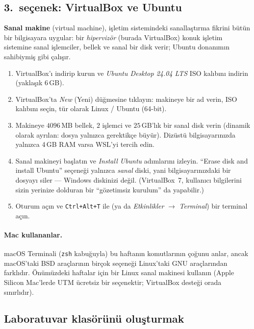 \documentclass[11pt,a4paper]{article}
\newcommand{\term}[1]{\textbf{\color{mintdeep}#1}}
\newcommand{\cmd}[1]{\texttt{#1}}
\begin{document}
\subsection{3.\ seçenek: VirtualBox ve Ubuntu}
\term{Sanal makine} (virtual machine), işletim sistemindeki sanallaştırma fikrini bütün bir bilgisayara uygular: bir \emph{hipervizör} (burada VirtualBox) konuk işletim sistemine sanal işlemciler, bellek ve sanal bir disk verir; Ubuntu donanımın sahibiymiş gibi çalışır.

\begin{enumerate}[leftmargin=1.4em]
  \item VirtualBox'ı indirip kurun ve \emph{Ubuntu Desktop 24.04 LTS} ISO kalıbını indirin (yaklaşık 6\,GB).
  \item VirtualBox'ta \emph{New} (Yeni) düğmesine tıklayın: makineye bir ad verin, ISO kalıbını seçin, tür olarak Linux / Ubuntu (64-bit).
  \item Makineye $4096$\,MB bellek, $2$ işlemci ve $25$\,GB'lık bir sanal disk verin (dinamik olarak ayrılan: dosya yalnızca gerektikçe büyür). Dizüstü bilgisayarınızda yalnızca 4\,GB RAM varsa WSL'yi tercih edin.
  \item Sanal makineyi başlatın ve \emph{Install Ubuntu} adımlarını izleyin. ``Erase disk and install Ubuntu'' seçeneği yalnızca \emph{sanal} diski, yani bilgisayarınızdaki bir dosyayı siler --- Windows diskinizi değil. (VirtualBox~7, kullanıcı bilgilerini sizin yerinize dolduran bir ``gözetimsiz kurulum'' da yapabilir.)
  \item Oturum açın ve \texttt{Ctrl+Alt+T} ile (ya da \emph{Etkinlikler} $\to$ \emph{Terminal}) bir terminal açın.
\end{enumerate}

\paragraph{Mac kullananlar.} macOS Terminali (\cmd{zsh} kabuğuyla) bu haftanın komutlarının çoğunu anlar, ancak macOS'taki BSD araçlarının birçok seçeneği Linux'taki GNU araçlarından farklıdır. Önümüzdeki haftalar için bir Linux sanal makinesi kullanın (Apple Silicon Mac'lerde UTM ücretsiz bir seçenektir; VirtualBox desteği orada sınırlıdır).

\subsection{Laboratuvar klasörünü oluşturmak}
\label{sec:labsetup}
\end{document}
